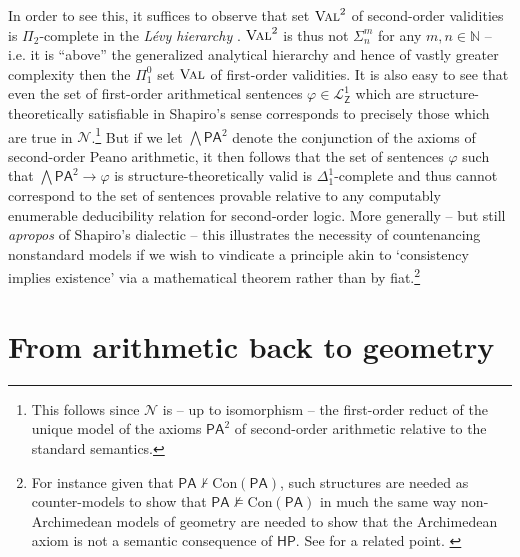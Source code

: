 \documentclass[11pt,fleqn,leqno]{article}
\def\phi{\varphi}
\def\proves{\vdash}
\begin{document}
In order to see this, it suffices to observe that set $\textsc{Val}^2$ of second-order validities is $\Pi_2$-complete in the \textsl{L\'evy hierarchy} \citep[Theorem 1]{Vaananen2001}.    $\textsc{Val}^2$  is thus not $\Sigma^m_n$ for any $m,n \in \mathbb{N}$ -- i.e.  it is ``above'' the generalized analytical hierarchy and hence of vastly greater complexity then the $\Pi^0_1$ set $\textsc{Val}$ of first-order validities.  It is also easy to see that even the set of first-order arithmetical sentences $\phi \in \mathcal{L}^1_{\mathsf{Z}}$ which are structure-theoretically satisfiable in Shapiro's sense corresponds to precisely those which are true in $\mathcal{N}$.\footnote{This follows since $\mathcal{N}$ is -- up to isomorphism -- the first-order reduct of the unique model of the axioms $\mathsf{PA}^2$ of second-order arithmetic relative to the standard semantics.}  But if we let  $\bigwedge \mathsf{PA}^2$ denote the conjunction of the axioms of second-order Peano arithmetic,  it then follows that the set of sentences $\phi$ such that $\bigwedge \mathsf{PA}^2 \rightarrow \phi$ is structure-theoretically valid is $\Delta^1_1$-complete and thus cannot correspond to the set of sentences provable relative to any computably enumerable deducibility relation for second-order logic.   More generally -- but still \textsl{apropos} of Shapiro's dialectic -- this illustrates the necessity of countenancing nonstandard models if we wish to vindicate a principle akin to `consistency implies existence' via a mathematical theorem rather than by fiat.\footnote{For instance given that $\mathsf{PA} \not\proves \mathrm{Con}(\mathsf{PA})$,  such structures are needed as counter-models to show that $\mathsf{PA} \not\models \mathrm{Con}(\mathsf{PA})$ in much the same way non-Archimedean models of geometry are needed to show that the Archimedean axiom is not a semantic consequence of $\mathsf{HP}$.  See \citep[pp. 27-30]{Isaacson2011a} for a related point. \label{solnote}}

\section{From arithmetic back to geometry}
\end{document}

